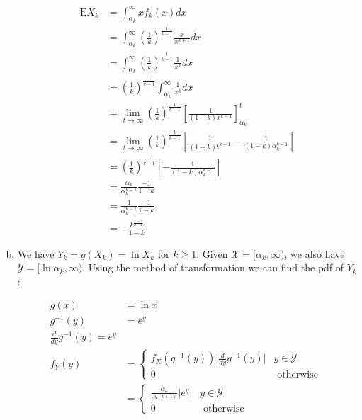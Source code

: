 \documentclass[11pt]{article}
\begin{document}
\begin{enumerate}[(a)]
    \begin{align*}
      \mathrm{E} X_k &= \int_{\alpha_k}^{\infty} x f_k(x) dx \\
      &= \int_{\alpha_k}^{\infty} \left( \frac{1}{k} \right)^{\frac{1}{k-1}} \frac{x}{x^{k+1}} dx \\
      &= \int_{\alpha_k}^{\infty} \left( \frac{1}{k} \right)^{\frac{1}{k-1}} \frac{1}{x^{k}} dx \\
      &= \left( \frac{1}{k} \right)^{\frac{1}{k-1}} \int_{\alpha_k}^{\infty} \frac{1}{x^{k}} dx \\
      &= \lim_{t \rightarrow \infty} \left( \frac{1}{k} \right)^{\frac{1}{k-1}} \left[ \frac{1}{(1-k)x^{k-1}} \right]_{\alpha_k}^{t} \\
      &= \lim_{t \rightarrow \infty} \left( \frac{1}{k} \right)^{\frac{1}{k-1}} \left[ \frac{1}{(1-k)t^{k-1}} - \frac{1}{(1-k) \alpha_k^{k-1}} \right] \\
      &= \left( \frac{1}{k} \right)^{\frac{1}{k-1}} \left[ -\frac{1}{(1-k) \alpha_k^{k-1}} \right] \\
      &= \frac{\alpha_k}{\alpha_k^{k-1}} \frac{-1}{1-k} \\
      &= \frac{1}{\alpha_k^{k-2}} \frac{-1}{1-k} \\
      &= -\frac{k^{\frac{k-2}{k-1}}}{1-k}
    \end{align*}

  \item We have $Y_k = g(X_k) = \ln{X_k}$ for $k \ge 1$.  Given $\mathcal{X} = [\alpha_k, \infty)$, we also have $\mathcal{Y} = [\ln{\alpha_k}, \infty)$.  Using the method of transformation we can find the pdf of $Y_k$:

    \begin{align*}
      g(x) &= \ln{x} \\
      g^{-1}(y) &= e^y \\
      \frac{d}{dy} g^{-1}(y) = e^y \\
      f_Y(y) &= 
      \begin{cases}
        f_X(g^{-1}(y)) \bigg| \frac{d}{dy} g^{-1}(y) \bigg| & y \in \mathcal{Y} \\
        0 & \text{ otherwise }
      \end{cases} \\
      &= 
      \begin{cases}
        \frac{\alpha_k}{e^{y(k+1)}} \bigg| e^y \bigg| & y \in \mathcal{Y} \\
        0 & \text{ otherwise }
      \end{cases}
    \end{align*}


\end{enumerate}
\end{document}
